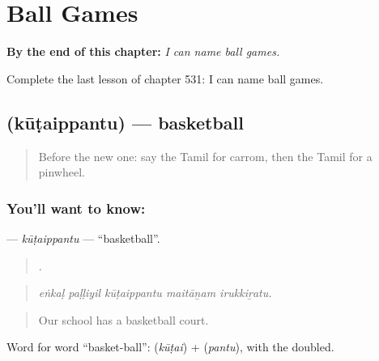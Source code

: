 
\chapter{Ball Games}
\label{ch:ta-ball-games}

\begin{chapteropening}
\textbf{By the end of this chapter:} \emph{I can name ball games.}

Complete the last lesson of chapter 531: I can name ball games.
\end{chapteropening}

\section[\texorpdfstring{\ta{கூடைப்பந்து} (kūṭaippantu)}{கூடைப்பந்து (kūṭaippantu)}]{ (kūṭaippantu) — basketball}

\label{lesson:TA-C531-kutaippantu}



\begin{quote}
Before the new one: say the Tamil for carrom, then the Tamil for a pinwheel.
\end{quote}

\subsection*{You'll want to know: }
\textbf{} — \emph{kūṭaippantu} — \textquotedblleft{}basketball\textquotedblright{}.

\begin{quote}
    .
\end{quote}

\begin{quote}
\emph{eṅkaḷ paḷḷiyil kūṭaippantu maitāṉam irukkiṟatu.}
\end{quote}

\begin{quote}
Our school has a basketball court.
\end{quote}

Word for word \textquotedblleft{}basket-ball\textquotedblright{}:  (\emph{kūṭai}) +  (\emph{pantu}), with the  doubled.

